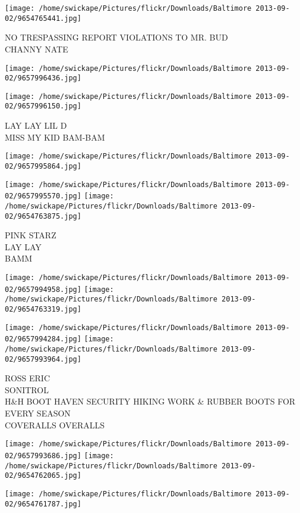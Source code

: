 \documentclass[10pt,letterpaper]{article}
\begin{document}
\vspace{0.25in}
\texttt{[image: /home/swickape/Pictures/flickr/Downloads/Baltimore 2013-09-02/9654765441.jpg]}

NO TRESPASSING REPORT VIOLATIONS TO MR. BUD\\
CHANNY NATE
\pagebreak

\texttt{[image: /home/swickape/Pictures/flickr/Downloads/Baltimore 2013-09-02/9657996436.jpg]}

\vspace{0.25in}
\texttt{[image: /home/swickape/Pictures/flickr/Downloads/Baltimore 2013-09-02/9657996150.jpg]}

LAY LAY LIL D\\
MISS MY KID BAM{-}BAM
\pagebreak

\texttt{[image: /home/swickape/Pictures/flickr/Downloads/Baltimore 2013-09-02/9657995864.jpg]}

\vspace{0.25in}
\texttt{[image: /home/swickape/Pictures/flickr/Downloads/Baltimore 2013-09-02/9657995570.jpg]}
\texttt{[image: /home/swickape/Pictures/flickr/Downloads/Baltimore 2013-09-02/9654763875.jpg]}

PINK STARZ\\
LAY LAY\\
BAMM
\pagebreak

\texttt{[image: /home/swickape/Pictures/flickr/Downloads/Baltimore 2013-09-02/9657994958.jpg]}
\texttt{[image: /home/swickape/Pictures/flickr/Downloads/Baltimore 2013-09-02/9654763319.jpg]}

\texttt{[image: /home/swickape/Pictures/flickr/Downloads/Baltimore 2013-09-02/9657994284.jpg]}
\texttt{[image: /home/swickape/Pictures/flickr/Downloads/Baltimore 2013-09-02/9657993964.jpg]}

ROSS ERIC\\
SONITROL\\
H\&H BOOT HAVEN SECURITY HIKING WORK \& RUBBER BOOTS FOR EVERY SEASON\\
COVERALLS OVERALLS
\pagebreak

\texttt{[image: /home/swickape/Pictures/flickr/Downloads/Baltimore 2013-09-02/9657993686.jpg]}
\texttt{[image: /home/swickape/Pictures/flickr/Downloads/Baltimore 2013-09-02/9654762065.jpg]}

\texttt{[image: /home/swickape/Pictures/flickr/Downloads/Baltimore 2013-09-02/9654761787.jpg]}
\end{document}
